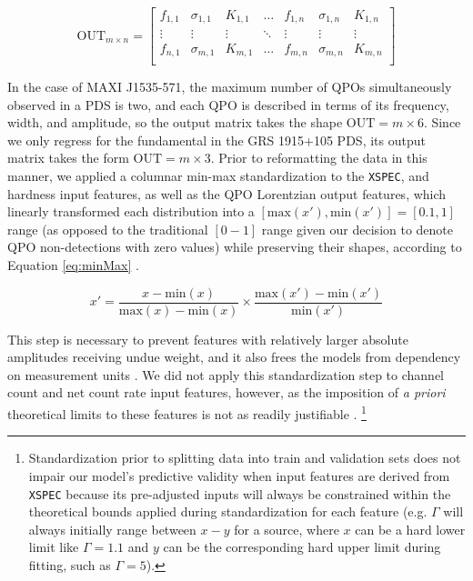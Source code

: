 \documentclass[fleqn,usenatbib,twocolumn]{mnras}%
\begin{document}
\begin{equation}\label{mat:qpo_matrix}
    \mathrm{OUT}_{m\times n} =
    \begin{bmatrix}
    f_{1,1} & \sigma_{1,1} &  K_{1,1} & \hdots & f_{1,n} &  \sigma_{1,n} &  K_{1,n}\\
    \vdots & \vdots & \vdots & \ddots & \vdots & \vdots & \vdots \\
    f_{n,1} & \sigma_{m,1} & K_{m,1} & \hdots & f_{m,n} & \sigma_{m,n} & K_{m,n} \\
    \end{bmatrix}
\end{equation}

In the case of MAXI J1535-571, the maximum number of QPOs simultaneously observed in a PDS is two, and each QPO is described in terms of its frequency, width, and amplitude, so the output matrix takes the shape $\mathrm{OUT}=m\times6$. Since we only regress for the fundamental in the GRS 1915+105 PDS, its output matrix takes the form $\mathrm{OUT}=m\times3$. Prior to reformatting the data in this manner, we applied a columnar min-max standardization to the \texttt{XSPEC}, and hardness input features, as well as the QPO Lorentzian output features, which linearly transformed each distribution into a $[\mathrm{max}(x'),\mathrm{min}(x')]=[0.1,1]$ range (as opposed to the traditional $[0-1]$ range given our decision to denote QPO non-detections with zero values) while preserving their shapes, according to Equation \ref{eq:minMax} \citep{Kandanaarachchi2019}.

\begin{equation}
    x' = \frac{x-\mathrm{min}(x)}{\mathrm{max}(x)-\mathrm{min}(x)} \times \frac{\mathrm{max}(x')-\mathrm{min}(x')}{\mathrm{min}(x')} \label{eq:minMax}
\end{equation}

This step is necessary to prevent features with relatively larger absolute amplitudes receiving undue weight, and it also frees the models from dependency on measurement units \citep{Akanbi2015, Han2012}. We did not apply this standardization step to channel count and net count rate input features, however, as the imposition of \textit{a priori} theoretical limits to these features is not as readily justifiable \citep{Pattnaik2020}.  \footnote{Standardization prior to splitting data into train and validation sets does not impair our model's predictive validity when input features are derived from 
\texttt{XSPEC} because its pre-adjusted inputs will always be constrained within the theoretical bounds applied during standardization for each feature (e.g. $\Gamma$ will always initially range between $x-y$ for a source, where $x$ can be a hard lower limit like $\Gamma=1.1$ and $y$ can be the corresponding hard upper limit during fitting, such as $\Gamma=5$).}
\end{document}
